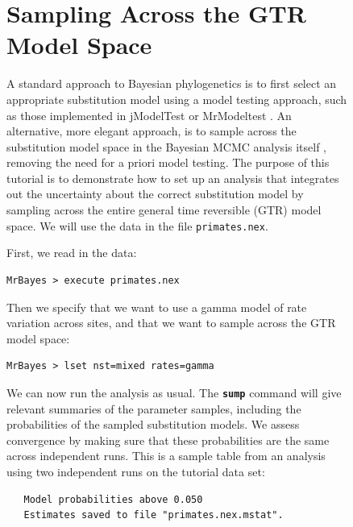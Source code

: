 \documentclass[12pt]{book}
\newcommand{\ttt}[1]{\texttt{#1}}
\newcommand{\tb}[1]{\ttt{\textbf{#1}}}
\begin{document}
\begin{figure}[h]
\section{Sampling Across the GTR Model Space}
\label{sampleGTR}

A standard approach to Bayesian phylogenetics is to first select an appropriate substitution model
using a model testing approach, such as those implemented in jModelTest \citep{posada08} or
MrModeltest \citep{nylander04b}. An alternative, more elegant approach, is to sample across the
substitution model space in the Bayesian MCMC analysis itself \citep{huelsenbeck04d}, removing the
need for a priori model testing. The purpose of this tutorial is to demonstrate how to set up an
analysis that integrates out the uncertainty about the correct substitution model by sampling
across the entire general time reversible (GTR) model space. We will use the data in the file
\ttt{primates.nex}.

First, we read in the data:

\begin{singlespacing}
\small
\begin{verbatim}
MrBayes > execute primates.nex
\end{verbatim}
\normalsize
\end{singlespacing}

Then we specify that we want to use a gamma model of rate variation across sites, and that we want
to sample across the GTR model space:

\begin{singlespacing}
\small
\begin{verbatim}
MrBayes > lset nst=mixed rates=gamma
\end{verbatim}
\normalsize
\end{singlespacing}

We can now run the analysis as usual. The \tb{sump} command will give relevant summaries of the
parameter samples, including the probabilities of the sampled substitution models. We assess
convergence by making sure that these probabilities are the same across independent runs. This is a
sample table from an analysis using two independent runs on the tutorial data set:

\begin{singlespacing}
\footnotesize
\begin{verbatim}
   Model probabilities above 0.050
   Estimates saved to file "primates.nex.mstat".


\end{verbatim}
\end{singlespacing}
\end{figure}
\end{document}
